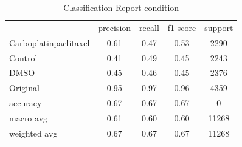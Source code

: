 \begin{table}[htbp]
\centering
\caption{Classification Report condition}
\label{tab:classificationreport.condition}
\begin{tabular}{lcccc}
 & precision & recall & f1-score & support \\
Carboplatinpaclitaxel & 0.61 & 0.47 & 0.53 & 2290 \\
Control & 0.41 & 0.49 & 0.45 & 2243 \\
DMSO & 0.45 & 0.46 & 0.45 & 2376 \\
Original & 0.95 & 0.97 & 0.96 & 4359 \\
accuracy & 0.67 & 0.67 & 0.67 & 0 \\
macro avg & 0.61 & 0.60 & 0.60 & 11268 \\
weighted avg & 0.67 & 0.67 & 0.67 & 11268 \\
\end{tabular}
\end{table}
